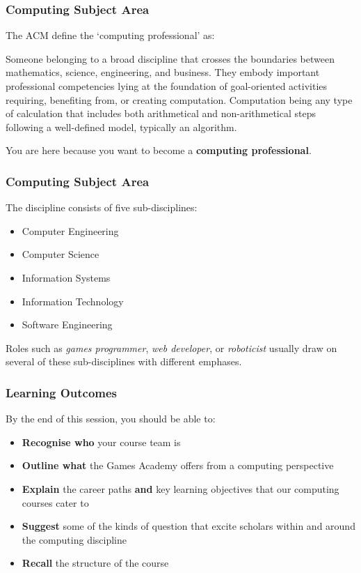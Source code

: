 \begin{frame}
	\frametitle{Computing Subject Area}
	
	The ACM define the `computing professional' as:
	
	\vspace{1em}
	
	Someone belonging to a broad discipline that crosses the boundaries between mathematics, science, engineering, and business. They embody important professional competencies lying at the foundation of goal-oriented activities requiring, benefiting from, or creating computation. Computation being any type of calculation that includes both arithmetical and non-arithmetical steps following a well-defined model, typically an algorithm.
	
	\vspace{1em}
	
	You are here because you want to become a \textbf{computing professional}.

\end{frame}

\begin{frame}
	\frametitle{Computing Subject Area}
	
	The discipline consists of five sub-disciplines:
	
	\begin{itemize}
		\item Computer Engineering
		\item Computer Science
		\item Information Systems
		\item Information Technology
		\item Software Engineering	
	\end{itemize}

	Roles such as \textit{games programmer}, \textit{web developer}, or \textit{roboticist} usually draw on several of these sub-disciplines with different emphases.

\end{frame}

\begin{frame}
	\frametitle{Learning Outcomes}
	
	By the end of this session, you should be able to:
	
	\begin{itemize}
		\item \textbf{Recognise who} your course team is
		\item \textbf{Outline what} the Games Academy offers from a computing perspective
		\item \textbf{Explain} the career paths \textbf{and} key learning objectives that our computing courses cater to
		\item \textbf{Suggest} some of the kinds of question that excite scholars within and around the computing discipline
		\item \textbf{Recall} the structure of the course
	\end{itemize}
\end{frame}

